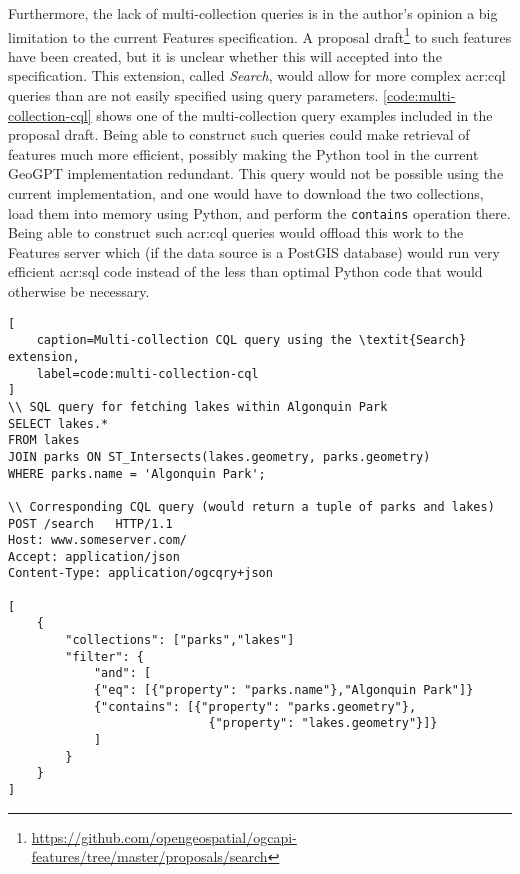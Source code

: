 Furthermore, the lack of multi-collection queries is in the author's opinion a big limitation to the current Features specification. A proposal draft\footnote{\url{https://github.com/opengeospatial/ogcapi-features/tree/master/proposals/search}} to such features have been created, but it is unclear whether this will accepted into the specification. This extension, called \textit{Search}, would allow for more complex \acrshort{acr:cql} queries than are not easily specified using query parameters. \autoref{code:multi-collection-cql} shows one of the multi-collection query examples included in the proposal draft. Being able to construct such queries could make retrieval of features much more efficient, possibly making the Python tool in the current GeoGPT implementation redundant. This query would not be possible using the current implementation, and one would have to download the two collections, load them into memory using Python, and perform the \texttt{contains} operation there. Being able to construct such \acrshort{acr:cql} queries would offload this work to the Features server which (if the data source is a PostGIS database) would run very efficient \acrshort{acr:sql} code instead of the less than optimal Python code that would otherwise be necessary.

\begin{lstlisting}[
    caption=Multi-collection CQL query using the \textit{Search} extension,
    label=code:multi-collection-cql
]
\\ SQL query for fetching lakes within Algonquin Park
SELECT lakes.*
FROM lakes
JOIN parks ON ST_Intersects(lakes.geometry, parks.geometry)
WHERE parks.name = 'Algonquin Park';

\\ Corresponding CQL query (would return a tuple of parks and lakes)
POST /search   HTTP/1.1                                           
Host: www.someserver.com/                                         
Accept: application/json                                          
Content-Type: application/ogcqry+json                             
                                                                    
[                                                                 
    {                                                              
        "collections": ["parks","lakes"]                            
        "filter": {                                                 
            "and": [                                                 
            {"eq": [{"property": "parks.name"},"Algonquin Park"]} 
            {"contains": [{"property": "parks.geometry"},         
                            {"property": "lakes.geometry"}]}        
            ]                                                        
        }                                                           
    }                                                              
]
\end{lstlisting}


